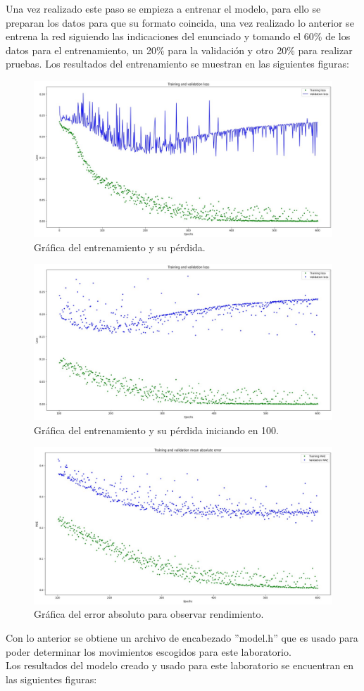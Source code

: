 Una vez realizado este paso se empieza a entrenar el modelo, para ello se preparan los datos para que su formato coincida, una vez realizado lo anterior se entrena la red siguiendo las indicaciones del enunciado y tomando el 60\% de los datos para el entrenamiento, un 20\% para la validación y otro 20\% para realizar pruebas. Los resultados del entrenamiento se muestran en las siguientes figuras:
\begin{figure}[H]
    \centering
    \includegraphics[width=.65\linewidth]{Imagenes/k (3).jpg}
    \caption{Gráfica del entrenamiento y su pérdida.}
\end{figure}

\begin{figure}[H]
    \centering
    \includegraphics[width=.65\linewidth]{Imagenes/k (4).jpg}
    \caption{Gráfica del entrenamiento y su pérdida iniciando en 100.}
\end{figure}

\begin{figure}[H]
    \centering
    \includegraphics[width=.65\linewidth]{Imagenes/k (5).jpg}
    \caption{Gráfica del error absoluto para observar rendimiento.}
\end{figure}

Con lo anterior se obtiene un archivo de encabezado ''model.h'' que es usado para poder determinar los movimientos escogidos para este laboratorio.\\

Los resultados del modelo creado y usado para este laboratorio se encuentran en las siguientes figuras:


\newpage